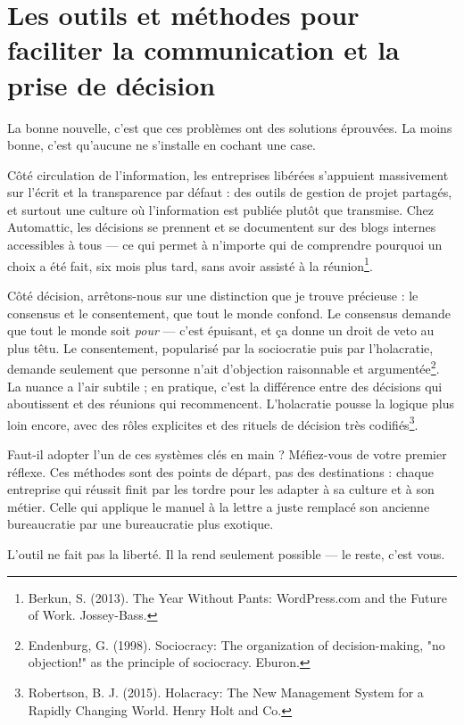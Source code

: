 \section{Les outils et méthodes pour faciliter la communication et la prise de décision}

La bonne nouvelle, c'est que ces problèmes ont des solutions éprouvées. La moins bonne, c'est qu'aucune ne s'installe en cochant une case.

Côté circulation de l'information, les entreprises libérées s'appuient massivement sur l'écrit et la transparence par défaut : des outils de gestion de projet partagés, et surtout une culture où l'information est publiée plutôt que transmise. Chez Automattic, les décisions se prennent et se documentent sur des blogs internes accessibles à tous — ce qui permet à n'importe qui de comprendre pourquoi un choix a été fait, six mois plus tard, sans avoir assisté à la réunion\footnote{Berkun, S. (2013). The Year Without Pants: WordPress.com and the Future of Work. Jossey-Bass.}.

Côté décision, arrêtons-nous sur une distinction que je trouve précieuse : le consensus et le consentement, que tout le monde confond. Le consensus demande que tout le monde soit \emph{pour} — c'est épuisant, et ça donne un droit de veto au plus têtu. Le consentement, popularisé par la sociocratie puis par l'holacratie, demande seulement que personne n'ait d'objection raisonnable et argumentée\footnote{Endenburg, G. (1998). Sociocracy: The organization of decision-making, "no objection!" as the principle of sociocracy. Eburon.}. La nuance a l'air subtile ; en pratique, c'est la différence entre des décisions qui aboutissent et des réunions qui recommencent. L'holacratie pousse la logique plus loin encore, avec des rôles explicites et des rituels de décision très codifiés\footnote{Robertson, B. J. (2015). Holacracy: The New Management System for a Rapidly Changing World. Henry Holt and Co.}.

Faut-il adopter l'un de ces systèmes clés en main ? Méfiez-vous de votre premier réflexe. Ces méthodes sont des points de départ, pas des destinations : chaque entreprise qui réussit finit par les tordre pour les adapter à sa culture et à son métier. Celle qui applique le manuel à la lettre a juste remplacé son ancienne bureaucratie par une bureaucratie plus exotique.

L'outil ne fait pas la liberté. Il la rend seulement possible — le reste, c'est vous.
